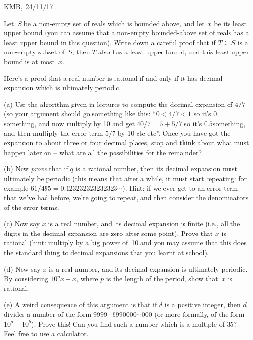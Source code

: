 \documentclass[10pt]{article}
\begin{document}
\begin{flushright} KMB,\ 24/11/17\end{flushright}


\medskip{} Let~$S$ be a non-empty set of reals which is bounded above, and let~$x$ be its least upper bound (you can assume that a non-empty bounded-above set of reals has a least upper bound in this question). Write down a careful proof that if $T\subseteq S$ is a non-empty subset of~$S$, then $T$ also has a least upper bound, and this least upper bound is at most~$x$.

\medskip{} Here's a proof that a real number is rational if and only if it has decimal expansion which is ultimately periodic.

(a) Use the algorithm given in lectures to compute the decimal expansion of $4/7$ (so your argument should go something like this: ``$0<4/7<1$ so it's $0.$something, and now multiply by 10 and get $40/7=5+5/7$ so it's $0.5$something, and then multiply the error term $5/7$ by 10 etc etc''. Once you have got the expansion to about three or four decimal places, stop and think about what must happen later on -- what are all the possibilities for the remainder?

(b) Now \emph{prove} that if $q$ is a rational number, then its decimal expansion must ultimately be periodic (this means that after a while, it must start repeating: for example $61/495=0.123232323232323\cdots$). Hint: if we ever get to an error term that we've had before, we're going to repeat, and then consider the denominators of the error terms.

(c) Now say $x$ is a real number, and its decimal expansion is finite (i.e., all the digits in the decimal expansion are zero after some point). Prove that $x$ is rational (hint: multiply by a big power of~10 and you may assume that this does the standard thing to decimal expansions that you learnt at school).

(d) Now say $x$ is a real number, and its decimal expansion is ultimately periodic. By considering $10^px-x$, where $p$ is the length of the period, show that~$x$ is rational.

(e) A weird consequence of this argument is that if $d$ is a positive integer, then $d$ divides a number of the form $9999\cdots9990000\cdots000$ (or more formally, of the form $10^a-10^b$). Prove this! Can you find such a number which is a multiple of 35? Feel free to use a calculator.
\end{document}
